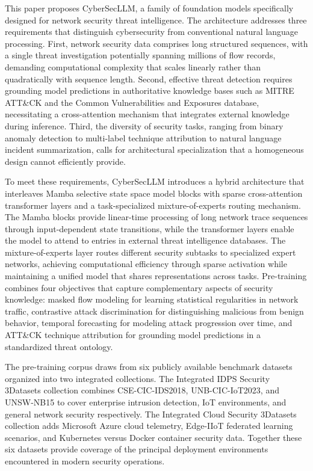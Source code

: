 \documentclass[journal]{IEEEtran}
\newcommand{\modelname}{CyberSecLLM}
\begin{document}
This paper proposes \modelname{}, a family of foundation models specifically designed for network security threat intelligence. The architecture addresses three requirements that distinguish cybersecurity from conventional natural language processing. First, network security data comprises long structured sequences, with a single threat investigation potentially spanning millions of flow records, demanding computational complexity that scales linearly rather than quadratically with sequence length. Second, effective threat detection requires grounding model predictions in authoritative knowledge bases such as MITRE ATT\&CK and the Common Vulnerabilities and Exposures database, necessitating a cross-attention mechanism that integrates external knowledge during inference. Third, the diversity of security tasks, ranging from binary anomaly detection to multi-label technique attribution to natural language incident summarization, calls for architectural specialization that a homogeneous design cannot efficiently provide.

To meet these requirements, \modelname{} introduces a hybrid architecture that interleaves Mamba selective state space model blocks with sparse cross-attention transformer layers and a task-specialized mixture-of-experts routing mechanism. The Mamba blocks provide linear-time processing of long network trace sequences through input-dependent state transitions, while the transformer layers enable the model to attend to entries in external threat intelligence databases. The mixture-of-experts layer routes different security subtasks to specialized expert networks, achieving computational efficiency through sparse activation while maintaining a unified model that shares representations across tasks. Pre-training combines four objectives that capture complementary aspects of security knowledge: masked flow modeling for learning statistical regularities in network traffic, contrastive attack discrimination for distinguishing malicious from benign behavior, temporal forecasting for modeling attack progression over time, and ATT\&CK technique attribution for grounding model predictions in a standardized threat ontology.

The pre-training corpus draws from six publicly available benchmark datasets organized into two integrated collections. The Integrated IDPS Security 3Datasets collection combines CSE-CIC-IDS2018, UNB-CIC-IoT2023, and UNSW-NB15 to cover enterprise intrusion detection, IoT environments, and general network security respectively. The Integrated Cloud Security 3Datasets collection adds Microsoft Azure cloud telemetry, Edge-IIoT federated learning scenarios, and Kubernetes versus Docker container security data. Together these six datasets provide coverage of the principal deployment environments encountered in modern security operations.
\end{document}
